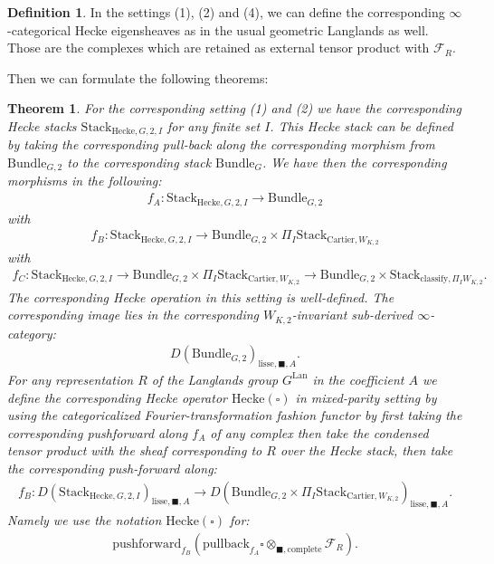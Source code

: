 \documentclass[12pt]{book}
\newtheorem{theorem}{Theorem}
\theoremstyle{definition}
\newtheorem{definition}{Definition}
\begin{document}
\begin{definition}
In the settings (1), (2) and (4), we can define the corresponding $\infty$-categorical Hecke eigensheaves as in the usual geometric Langlands as well. Those are the complexes which are retained as external tensor product with $\mathcal{F}_R$.
\end{definition}





\indent Then we can formulate the following theorems:
\begin{theorem}\label{theorem17}
For the corresponding setting (1) and (2) we have the corresponding Hecke stacks $\mathrm{Stack}_{\mathrm{Hecke},G,2,I}$ for any finite set $I$. This Hecke stack can be defined by taking the corresponding pull-back along the corresponding morphism from $\mathrm{Bundle}_{G,2}$ to the corresponding stack $\mathrm{Bundle}_{G}$. We have then the corresponding morphisms in the following:
\begin{align}
f_A: \mathrm{Stack}_{\mathrm{Hecke},G,2,I} \rightarrow \mathrm{Bundle}_{G,2}
\end{align}
with
\begin{align}
f_B: \mathrm{Stack}_{\mathrm{Hecke},G,2,I} \rightarrow \mathrm{Bundle}_{G,2}\times \Pi_I \mathrm{Stack}_{\mathrm{Cartier},W_{K,2}}
\end{align}
with
\begin{align}
f_C: \mathrm{Stack}_{\mathrm{Hecke},G,2,I} \rightarrow \mathrm{Bundle}_{G,2}\times\Pi_I  \mathrm{Stack}_{\mathrm{Cartier},W_{K,2}}\rightarrow \mathrm{Bundle}_{G,2}\times \mathrm{Stack}_{\mathrm{classify},\Pi_I W_{K,2}}.
\end{align}
The corresponding Hecke operation in this setting is well-defined. The corresponding image lies in the corresponding $W_{K,2}$-invariant sub-derived $\infty$-category:
\begin{align}
D(\mathrm{Bundle}_{G,2})_{\text{lisse},\blacksquare,A}.
\end{align}
For any representation $R$ of the Langlands group $G^\mathrm{Lan}$ in the coefficient $A$ we define the corresponding Hecke operator $\mathrm{Hecke}(\square)$ in mixed-parity setting by using the categoricalized Fourier-transformation fashion functor by first taking the corresponding pushforward along $f_A$ of any complex then take the condensed tensor product with the sheaf corresponding to $R$ over the Hecke stack, then take the corresponding push-forward along:
\begin{align}
f_B: D(\mathrm{Stack}_{\mathrm{Hecke},G,2,I})_{\text{lisse},\blacksquare,A} \rightarrow D(\mathrm{Bundle}_{G,2}\times \Pi_I \mathrm{Stack}_{\mathrm{Cartier},W_{K,2}})_{\text{lisse},\blacksquare,A}.
\end{align}
Namely we use the notation $\mathrm{Hecke}(\square)$ for:
\begin{align}
\mathrm{pushforward}_{f_B}(\mathrm{pullback}_{f_A}\square\otimes_{\blacksquare,\mathrm{complete}}\mathcal{F}_R).
\end{align}
\end{theorem}
\end{document}
